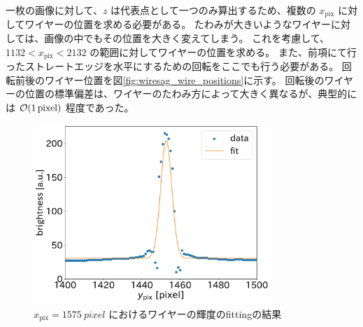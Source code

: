 \documentclass[../../main.tex]{subfiles}
\begin{document}
一枚の画像に対して、$z$ は代表点として一つのみ算出するため、複数の $x_{\mathrm{pix}}$ に対してワイヤーの位置を求める必要がある。
たわみが大きいようなワイヤーに対しては、画像の中でもその位置を大きく変えてしまう。
これを考慮して、$1132 < x_{\mathrm{pix}} < 2132$ の範囲に対してワイヤーの位置を求める。
また、前項にて行ったストレートエッジを水平にするための回転をここでも行う必要がある。
回転前後のワイヤー位置を図\ref{fig:wiresag_wire_positions}に示す。
回転後のワイヤーの位置の標準偏差は、ワイヤーのたわみ方によって大きく異なるが、典型的には $\order{\SI{1}{pixel}}$ 程度であった。
\begin{figure}[H]
    \centering
    \includegraphics[width=0.8\textwidth]{wiresag/wiresag_wire_fit.pdf}
    \caption{$x_{\mathrm{pix}}=\SI{1575}{pixel}$ におけるワイヤーの輝度のfittingの結果}
    \label{fig:wiresag_wire_fit}
\end{figure}
\end{document}
